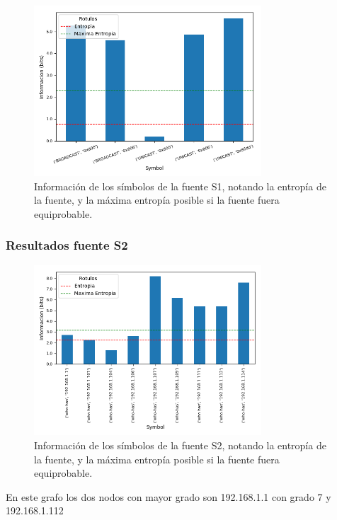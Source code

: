 \begin{figure}[H]
  \centering
  \includegraphics[width=8.5cm]{figs/information_hogar_ethernet_S1_output.png}
  \caption{\normalfont Información de los símbolos de la fuente S1, notando la entropía de la fuente, y la máxima entropía posible si la fuente fuera equiprobable.}
\end{figure}

\subsubsection*{Resultados fuente S2}

\begin{figure}[H]
  \centering
  \includegraphics[width=8.5cm]{figs/information_hogar_ethernet_S2_output.png}
  \caption{\normalfont Información de los símbolos de la fuente S2, notando la entropía de la fuente, y la máxima entropía posible si la fuente fuera equiprobable.}
\end{figure}

En este grafo los dos nodos con mayor grado son 192.168.1.1 con grado 7 y 192.168.1.112

